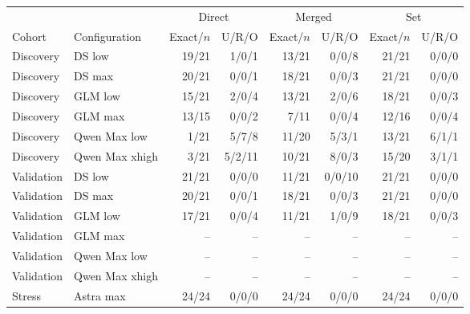 \begin{tabular}{@{}llrrrrrr@{}}
\toprule
&&\multicolumn{2}{c}{Direct}&\multicolumn{2}{c}{Merged}&\multicolumn{2}{c}{Set}\\
Cohort & Configuration & Exact/$n$ & U/R/O & Exact/$n$ & U/R/O & Exact/$n$ & U/R/O\\
\midrule
Discovery & DS low & 19/21 & 1/0/1 & 13/21 & 0/0/8 & 21/21 & 0/0/0\\
Discovery & DS max & 20/21 & 0/0/1 & 18/21 & 0/0/3 & 21/21 & 0/0/0\\
Discovery & GLM low & 15/21 & 2/0/4 & 13/21 & 2/0/6 & 18/21 & 0/0/3\\
Discovery & GLM max & 13/15 & 0/0/2 & 7/11 & 0/0/4 & 12/16 & 0/0/4\\
Discovery & Qwen Max low & 1/21 & 5/7/8 & 11/20 & 5/3/1 & 13/21 & 6/1/1\\
Discovery & Qwen Max xhigh & 3/21 & 5/2/11 & 10/21 & 8/0/3 & 15/20 & 3/1/1\\
\midrule
Validation & DS low & 21/21 & 0/0/0 & 11/21 & 0/0/10 & 21/21 & 0/0/0\\
Validation & DS max & 20/21 & 0/0/1 & 18/21 & 0/0/3 & 21/21 & 0/0/0\\
Validation & GLM low & 17/21 & 0/0/4 & 11/21 & 1/0/9 & 18/21 & 0/0/3\\
Validation & GLM max & -- & -- & -- & -- & -- & --\\
Validation & Qwen Max low & -- & -- & -- & -- & -- & --\\
Validation & Qwen Max xhigh & -- & -- & -- & -- & -- & --\\
\midrule
Stress & Astra max & 24/24 & 0/0/0 & 24/24 & 0/0/0 & 24/24 & 0/0/0\\
\bottomrule
\end{tabular}
